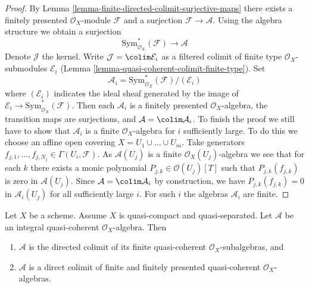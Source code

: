 \begin{proof}
By Lemma \ref{lemma-finite-directed-colimit-surjective-maps}
there exists a finitely presented $\mathcal{O}_X$-module
$\mathcal{F}$ and a surjection $\mathcal{F} \to \mathcal{A}$.
Using the algebra structure we obtain a surjection
$$
\text{Sym}^*_{\mathcal{O}_X}(\mathcal{F}) \longrightarrow \mathcal{A}
$$
Denote $\mathcal{J}$ the kernel. Write $\mathcal{J} = \colim \mathcal{E}_i$
as a filtered colimit of finite type $\mathcal{O}_X$-submodules
$\mathcal{E}_i$ (Lemma \ref{lemma-quasi-coherent-colimit-finite-type}). Set
$$
\mathcal{A}_i = \text{Sym}^*_{\mathcal{O}_X}(\mathcal{F})/(\mathcal{E}_i)
$$
where $(\mathcal{E}_i)$ indicates the ideal sheaf generated by
the image of $\mathcal{E}_i \to \text{Sym}^*_{\mathcal{O}_X}(\mathcal{F})$.
Then each $\mathcal{A}_i$ is a finitely presented $\mathcal{O}_X$-algebra,
the transition maps are surjections,
and $\mathcal{A} = \colim \mathcal{A}_i$. To finish the proof we still
have to show that $\mathcal{A}_i$ is a finite $\mathcal{O}_X$-algebra
for $i$ sufficiently large. To do this we choose an affine open
covering $X = U_1 \cup \ldots \cup U_m$. Take generators
$f_{j, 1}, \ldots, f_{j, N_j} \in \Gamma(U_i, \mathcal{F})$.
As $\mathcal{A}(U_j)$ is a finite $\mathcal{O}_X(U_j)$-algebra we
see that for each $k$ there exists a monic polynomial
$P_{j, k} \in \mathcal{O}(U_j)[T]$ such that $P_{j, k}(f_{j, k})$
is zero in $\mathcal{A}(U_j)$. Since
$\mathcal{A} = \colim \mathcal{A}_i$ by construction, we
have $P_{j, k}(f_{j, k}) = 0$ in $\mathcal{A}_i(U_j)$
for all sufficiently large $i$. For such $i$ the algebras
$\mathcal{A}_i$ are finite.
\end{proof}

\begin{lemma}
\label{lemma-integral-algebra-directed-colimit-finite}
Let $X$ be a scheme. Assume $X$ is quasi-compact and quasi-separated.
Let $\mathcal{A}$ be an integral quasi-coherent $\mathcal{O}_X$-algebra.
Then
\begin{enumerate}
\item $\mathcal{A}$ is the directed colimit of its finite
quasi-coherent $\mathcal{O}_X$-subalgebras, and
\item $\mathcal{A}$ is a direct colimit of finite and finitely
presented quasi-coherent $\mathcal{O}_X$-algebras.
\end{enumerate}
\end{lemma}

